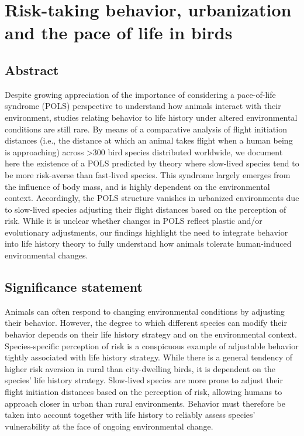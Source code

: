 \chapter[Risk-taking behavior, urbanization and POLS]{Risk-taking behavior, urbanization and the pace of life in birds}\label{ch:POLS}

\clearpage

\section*{Abstract}

Despite growing appreciation of the importance of considering a pace-of-life syndrome (POLS) perspective to understand how
animals interact with their environment, studies relating behavior to life history under altered environmental conditions are still
rare. By means of a comparative analysis of flight initiation distances (i.e., the distance at which an animal takes flight when a
human being is approaching) across \textgreater{300} bird species distributed worldwide, we document here the existence of a POLS
predicted by theory where slow-lived species tend to be more risk-averse than fast-lived species. This syndrome largely emerges
from the influence of body mass, and is highly dependent on the environmental context. Accordingly, the POLS structure
vanishes in urbanized environments due to slow-lived species adjusting their flight distances based on the perception of risk.
While it is unclear whether changes in POLS reflect plastic and/or evolutionary adjustments, our findings highlight the need to
integrate behavior into life history theory to fully understand how animals tolerate human-induced environmental changes.


\section*{Significance statement}

Animals can often respond to changing environmental conditions by adjusting their behavior. However, the degree to which
different species can modify their behavior depends on their life history strategy and on the environmental context. 
Species-specific perception of risk is a conspicuous example of adjustable behavior tightly associated with life history strategy. While
there is a general tendency of higher risk aversion in rural than city-dwelling birds, it is dependent on the species’ life history
strategy. Slow-lived species are more prone to adjust their flight initiation distances based on the perception of risk, allowing
humans to approach closer in urban than rural environments. Behavior must therefore be taken into account together with life
history to reliably assess species’ vulnerability at the face of ongoing environmental change.


